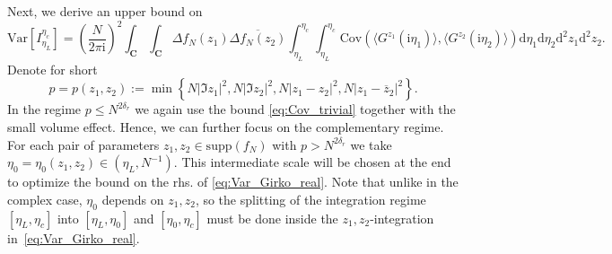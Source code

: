 \documentclass[10pt]{amsart}
\numberwithin{equation}{section}
\newcommand{\dif}{\mathrm{d}}
\newcommand{\C}{\mathbf{C}}
\newcommand{\Cov}{\mathrm{Cov}}
\newcommand{\Var}{\mathrm{Var}}
\newcommand{\ii}{\mathrm{i}}
\begin{document}
Next, we derive an upper bound on 
\begin{equation}
\Var[I_{\eta_L}^{\eta_c}]= \left(\frac{N}{2\pi\ii}\right)^2 \int_\C\int_\C \Delta f_N(z_1)\overline{\Delta f_N(z_2)} \int_{\eta_L}^{\eta_c}\int_{\eta_L}^{\eta_c} \Cov\left(\langle G^{z_1}(\ii\eta_1)\rangle, \langle G^{z_2}(\ii\eta_2)\rangle\right)\dif\eta_1\dif\eta_2\dif^2 z_1\dif^2 z_2.
\label{eq:Var_Girko_real}
\end{equation}
Denote for short
\begin{equation}
p=p(z_1,z_2):=\min\left\lbrace N|\Im z_1|^2, N|\Im z_2|^2, N|z_1-z_2|^2, N|z_1-\overline{z}_2|^2\right\rbrace.
\end{equation} 
In the regime $p\le N^{2\delta_r}$ we again use the bound \eqref{eq:Cov_trivial} together with the small volume effect. Hence, we can further focus on the complementary regime. For each pair of parameters $z_1,z_2\in \mathrm{supp}(f_N)$ with $p>N^{2\delta_r}$ we take $\eta_0=\eta_0(z_1,z_2)\in (\eta_L,N^{-1})$. This intermediate scale will be chosen at the end to optimize the bound on the rhs. of \eqref{eq:Var_Girko_real}. Note that unlike in the complex case, $\eta_0$ depends on $z_1, z_2$, so  the splitting of the integration regime $[\eta_L,\eta_c]$ into $[\eta_L,\eta_0]$ and $[\eta_0,\eta_c]$ must be done inside the $z_1, z_2$-integration in~\eqref{eq:Var_Girko_real}. 
\end{document}
